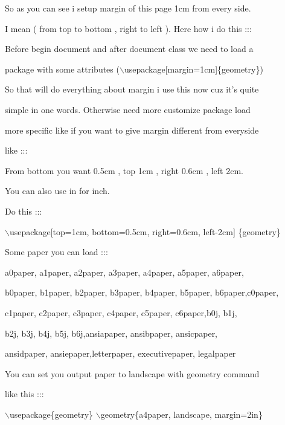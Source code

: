\documentclass[11pt]{article}
\begin{document}
So as you can see i setup margin of this page 1cm from every side.

I mean ( from top to bottom , right to left ). Here how i do this :::

\vspace{0.5cm}

Before begin document and after document class we need to load a

 package with some attributes ($\backslash$usepackage[margin=1cm]\{geometry\})

So that will do everything about margin i use this now cuz it's quite

 simple in one words. Otherwise need more customize package load 
 
 more specific like if you want to give margin different from everyside
 
  like :::

\vspace{0.5cm}

From bottom you want 0.5cm , top 1cm , right 0.6cm , left 2cm. 

You can also use in for inch.

\vspace{0.5cm}

Do this :::

$\backslash$usepackage[top=1cm, bottom=0.5cm, right=0.6cm, left-2cm]
\{geometry\}

\vspace{0.5cm}

Some paper you can load :::

a0paper, a1paper, a2paper, a3paper, a4paper, a5paper, a6paper,

b0paper, b1paper, b2paper, b3paper, b4paper, b5paper, b6paper,c0paper,

 c1paper, c2paper, c3paper, c4paper, c5paper, c6paper,b0j, b1j,
 
  b2j, b3j, b4j, b5j, b6j,ansiapaper, ansibpaper, ansicpaper,
  
   ansidpaper, ansiepaper,letterpaper, executivepaper, legalpaper

\vspace{0.5cm}

You can set you output paper to landscape with geometry command 

like this :::

$\backslash$usepackage\{geometry\}
$\backslash$geometry\{a4paper, landscape, margin=2in\}

\vspace{0.5cm}
\end{document}
